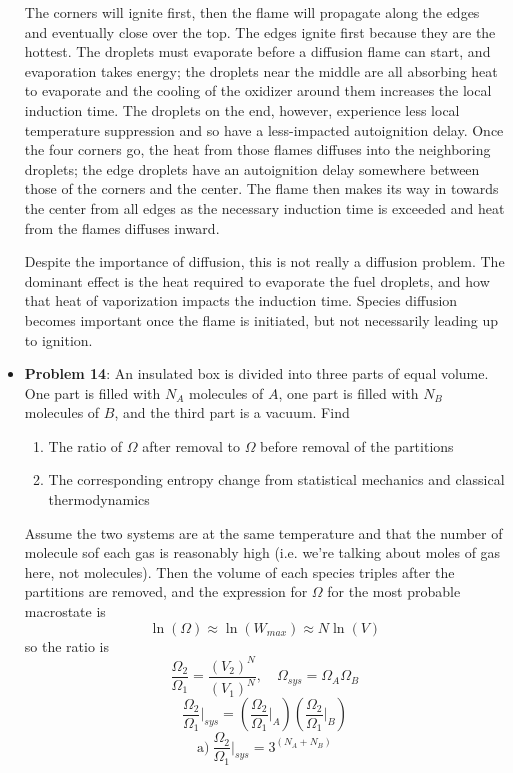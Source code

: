 \documentclass[11pt]{article}
\newcommand{\Item}[1]{\item \textbf{#1}:}
\newcommand{\Problem}[1]{\Item{Problem #1}}
\begin{document}
\begin{itemize}
\vspace{0.75cm}
The corners will ignite first, then the flame will propagate along the edges and eventually close over the top. The edges ignite first because they are the hottest. The droplets must evaporate before a diffusion flame can start, and evaporation takes energy; the droplets near the middle are all absorbing heat to evaporate and the cooling of the oxidizer around them increases the local induction time. The droplets on the end, however, experience less local temperature suppression and so have a less-impacted autoignition delay. Once the four corners go, the heat from those flames diffuses into the neighboring droplets; the edge droplets have an autoignition delay somewhere between those of the corners and the center. The flame then makes its way in towards the center from all edges as the necessary induction time is exceeded and heat from the flames diffuses inward.

Despite the importance of diffusion, this is not really a diffusion problem. The dominant effect is the heat required to evaporate the fuel droplets, and how that heat of vaporization impacts the induction time. Species diffusion becomes important once the flame is initiated, but not necessarily leading up to ignition.

\Problem{14} An insulated box is divided into three parts of equal volume. One part is filled with $N_A$ molecules of $A$, one part is filled with $N_B$ molecules of $B$, and the third part is a vacuum. Find
\begin{enumerate}[label = \alph*)]
\item The ratio of $\Omega$ after removal to $\Omega$ before removal of the partitions
\item The corresponding entropy change from statistical mechanics and classical thermodynamics
\end{enumerate}

Assume the two systems are at the same temperature and that the number of molecule sof each gas is reasonably high (i.e. we're talking about moles of gas here, not molecules). Then the volume of each species triples after the partitions are removed, and the expression for $\Omega$ for the most probable macrostate is
$$\ln(\Omega) \approx \ln(W_{max}) \approx N\ln(V)$$
so the ratio is
$$\frac{\Omega_2}{\Omega_1} = \frac{(V_2)^N}{(V_1)^N},\quad \Omega_{sys} = \Omega_A\Omega_B$$
$$\frac{\Omega_2}{\Omega_1}\Big|_{sys} = \left(\frac{\Omega_2}{\Omega_1}\Big|_A\right)\left(\frac{\Omega_2}{\Omega_1}\Big|_B\right)$$
$$\textrm{a})\ \frac{\Omega_2}{\Omega_1}\Big|_{sys} = 3^{(N_A+N_B)}$$


\end{itemize}
\end{document}
